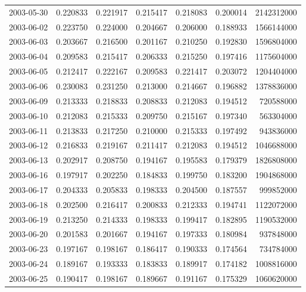 \begin{tabular}{lrrrrrr}
2003-05-30 &    0.220833 &    0.221917 &    0.215417 &    0.218083 &    0.200014 &  2142312000 \\
2003-06-02 &    0.223750 &    0.224000 &    0.204667 &    0.206000 &    0.188933 &  1566144000 \\
2003-06-03 &    0.203667 &    0.216500 &    0.201167 &    0.210250 &    0.192830 &  1596804000 \\
2003-06-04 &    0.209583 &    0.215417 &    0.206333 &    0.215250 &    0.197416 &  1175604000 \\
2003-06-05 &    0.212417 &    0.222167 &    0.209583 &    0.221417 &    0.203072 &  1204404000 \\
2003-06-06 &    0.230083 &    0.231250 &    0.213000 &    0.214667 &    0.196882 &  1378836000 \\
2003-06-09 &    0.213333 &    0.218833 &    0.208833 &    0.212083 &    0.194512 &   720588000 \\
2003-06-10 &    0.212083 &    0.215333 &    0.209750 &    0.215167 &    0.197340 &   563304000 \\
2003-06-11 &    0.213833 &    0.217250 &    0.210000 &    0.215333 &    0.197492 &   943836000 \\
2003-06-12 &    0.216833 &    0.219167 &    0.211417 &    0.212083 &    0.194512 &  1046688000 \\
2003-06-13 &    0.202917 &    0.208750 &    0.194167 &    0.195583 &    0.179379 &  1826808000 \\
2003-06-16 &    0.197917 &    0.202250 &    0.184833 &    0.199750 &    0.183200 &  1904868000 \\
2003-06-17 &    0.204333 &    0.205833 &    0.198333 &    0.204500 &    0.187557 &   999852000 \\
2003-06-18 &    0.202500 &    0.216417 &    0.200833 &    0.212333 &    0.194741 &  1122072000 \\
2003-06-19 &    0.213250 &    0.214333 &    0.198333 &    0.199417 &    0.182895 &  1190532000 \\
2003-06-20 &    0.201583 &    0.201667 &    0.194167 &    0.197333 &    0.180984 &   937848000 \\
2003-06-23 &    0.197167 &    0.198167 &    0.186417 &    0.190333 &    0.174564 &   734784000 \\
2003-06-24 &    0.189167 &    0.193333 &    0.183833 &    0.189917 &    0.174182 &  1008816000 \\
2003-06-25 &    0.190417 &    0.198167 &    0.189667 &    0.191167 &    0.175329 &  1060620000 \\

\end{tabular}
